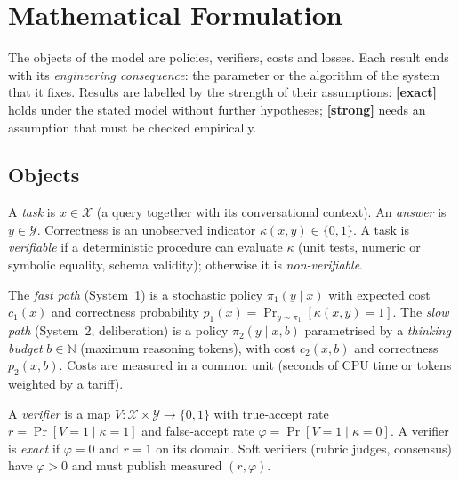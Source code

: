 \section{Mathematical Formulation}
\label{sec:math}

The objects of the model are policies, verifiers, costs and losses. Each
result ends with its \emph{engineering consequence}: the parameter or the
algorithm of the system that it fixes. Results are labelled by the strength of
their assumptions: \textbf{[exact]} holds under the stated model without further
hypotheses; \textbf{[strong]} needs an assumption that must be checked
empirically.

\subsection{Objects}
\label{sec:objects}

\begin{definition}
A \emph{task} is $x\in\mathcal X$ (a query together with its conversational
context). An \emph{answer} is $y\in\mathcal Y$. Correctness is an unobserved
indicator $\kappa(x,y)\in\{0,1\}$. A task is \emph{verifiable} if a deterministic
procedure can evaluate $\kappa$ (unit tests, numeric or symbolic equality,
schema validity); otherwise it is \emph{non-verifiable}.
\end{definition}

\begin{definition}
The \emph{fast path} (System~1) is a stochastic policy $\pi_1(y\mid x)$ with expected cost
$c_1(x)$ and correctness probability $p_1(x)=\Pr_{y\sim\pi_1}[\kappa(x,y)=1]$.
The \emph{slow path} (System~2, deliberation) is a policy $\pi_2(y\mid x,b)$
parametrised by a \emph{thinking budget} $b\in\mathbb N$ (maximum reasoning
tokens), with cost $c_2(x,b)$ and correctness $p_2(x,b)$. Costs are measured in
a common unit (seconds of CPU time or tokens weighted by a tariff).
\end{definition}

\begin{definition}[Verifier]
A \emph{verifier} is a map $V:\mathcal X\times\mathcal Y\to\{0,1\}$ with
true-accept rate $r=\Pr[V=1\mid\kappa=1]$ and false-accept rate
$\varphi=\Pr[V=1\mid\kappa=0]$. A verifier is \emph{exact} if $\varphi=0$ and
$r=1$ on its domain. Soft verifiers (rubric judges, consensus) have
$\varphi>0$ and must publish measured $(r,\varphi)$.
\end{definition}

